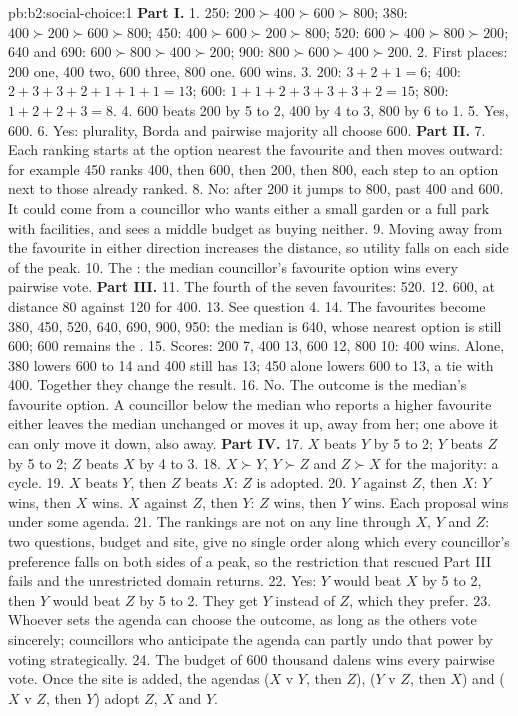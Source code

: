\begin{solution}{pb:b2:social-choice:1}
\textbf{Part I.}
1. 250: $200 \succ 400 \succ 600 \succ 800$; 380: $400 \succ 200 \succ 600 \succ 800$; 450: $400 \succ 600 \succ 200 \succ 800$;
520: $600 \succ 400 \succ 800 \succ 200$; 640 and 690: $600 \succ 800 \succ 400 \succ 200$; 900: $800 \succ 600 \succ 400 \succ 200$.
2. First places: 200 one, 400 two, 600 three, 800 one. 600 wins.
3. 200: $3 + 2 + 1 = 6$; 400: $2 + 3 + 3 + 2 + 1 + 1 + 1 = 13$; 600: $1 + 1 + 2 + 3 + 3 + 3 + 2 = 15$; 800: $1 + 2 + 2 + 3 = 8$.
4. 600 beats 200 by 5 to 2, 400 by 4 to 3, 800 by 6 to 1.
5. Yes, 600.
6. Yes: plurality, Borda and pairwise majority all choose 600.
\textbf{Part II.}
7. Each ranking starts at the option nearest the favourite and then moves outward: for example 450 ranks 400,
then 600, then 200, then 800, each step to an option next to those already ranked.
8. No: after 200 it jumps to 800, past 400 and 600. It could come from a councillor who wants either a small
garden or a full park with facilities, and sees a middle budget as buying neither.
9. Moving away from the favourite in either direction increases the distance, so utility falls on each side
of the peak.
10. The : the median councillor's favourite option wins every pairwise vote.
\textbf{Part III.}
11. The fourth of the seven favourites: 520.
12. 600, at distance 80 against 120 for 400.
13. See question 4.
14. The favourites become 380, 450, 520, 640, 690, 900, 950: the median is 640, whose nearest option is still 600; 600
remains the .
15. Scores: 200 7, 400 13, 600 12, 800 10: 400 wins. Alone, 380 lowers 600 to 14 and 400 still has 13; 450 alone lowers 600
to 13, a tie with 400. Together they change the result.
16. No. The outcome is the median's favourite option. A councillor below the median who reports a higher favourite
either leaves the median unchanged or moves it up, away from her; one above it can only move it down, also away.
\textbf{Part IV.}
17. $X$ beats $Y$ by 5 to 2; $Y$ beats $Z$ by 5 to 2; $Z$ beats $X$ by 4 to 3.
18. $X \succ Y$, $Y \succ Z$ and $Z \succ X$ for the majority: a cycle.
19. $X$ beats $Y$, then $Z$ beats $X$: $Z$ is adopted.
20. $Y$ against $Z$, then $X$: $Y$ wins, then $X$ wins. $X$ against $Z$, then $Y$: $Z$ wins, then $Y$ wins. Each proposal wins
under some agenda.
21. The rankings are not  on any line through $X$, $Y$ and $Z$: two questions, budget and site, give no
single order along which every councillor's preference falls on both sides of a peak, so the restriction that
rescued Part III fails and the unrestricted domain returns.
22. Yes: $Y$ would beat $X$ by 5 to 2, then $Y$ would beat $Z$ by 5 to 2. They get $Y$ instead of $Z$, which they prefer.
23. Whoever sets the agenda can choose the outcome, as long as the others vote sincerely; councillors who
anticipate the agenda can partly undo that power by voting strategically.
24. The budget of 600 thousand dalens wins every pairwise vote. Once the site is added, the agendas ($X$ v $Y$, then
$Z$), ($Y$ v $Z$, then $X$) and ($X$ v $Z$, then $Y$) adopt $Z$, $X$ and $Y$.
\end{solution}
